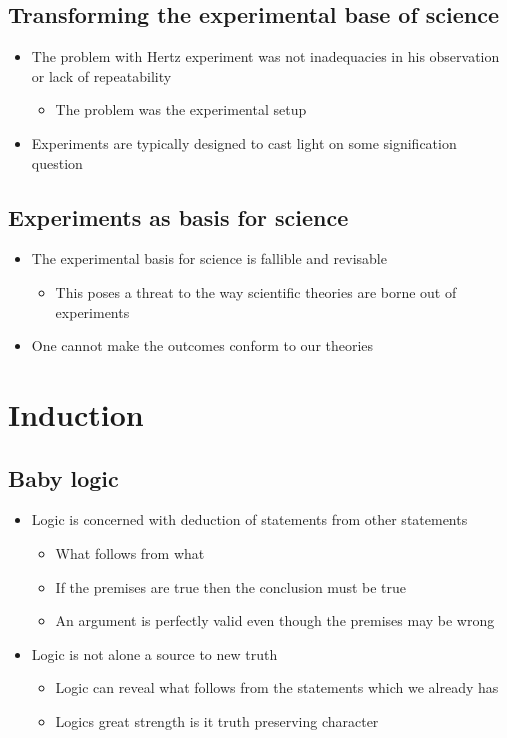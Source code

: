 \documentclass[11pt]{article}
\begin{document}
\subsection{Transforming the experimental base of science}
\label{sec:orge653a80}
\begin{itemize}
\item The problem with Hertz experiment was not inadequacies in his observation or lack of repeatability
\begin{itemize}
\item The problem was the experimental setup
\end{itemize}
\item Experiments are typically designed to cast light on some signification question
\end{itemize}

\subsection{Experiments as basis for science}
\label{sec:orgbef2ae0}
\begin{itemize}
\item The experimental basis for science is fallible and revisable
\begin{itemize}
\item This poses a threat to the way scientific theories are borne out of experiments
\end{itemize}
\item One cannot make the outcomes conform to our theories
\end{itemize}

\section{Induction}
\label{sec:org75cf0ed}
\subsection{Baby logic}
\label{sec:orga9c2bcb}
\begin{itemize}
\item Logic is concerned with deduction of statements from other statements
\begin{itemize}
\item What follows from what
\item If the premises are true then the conclusion must be true
\item An argument is perfectly valid even though the premises may be wrong
\end{itemize}
\item Logic is not alone a source to new truth
\begin{itemize}
\item Logic can reveal what follows from the statements which we already has
\item Logics great strength is it truth preserving character
\end{itemize}
\end{itemize}
\end{document}
